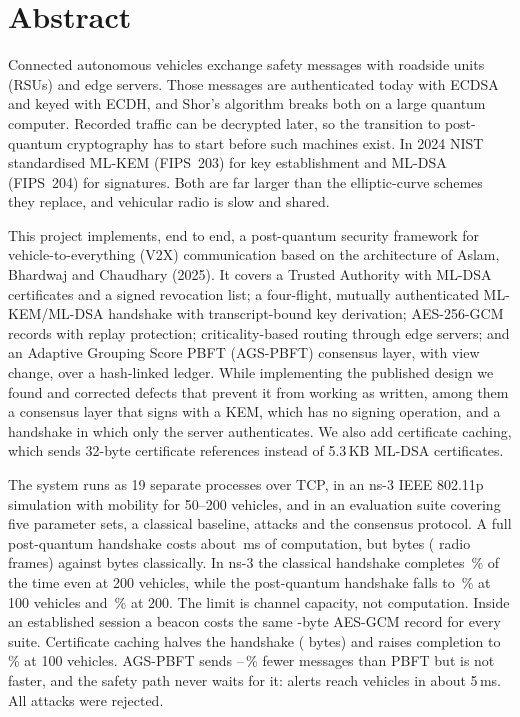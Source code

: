 \chapter*{Abstract}

Connected autonomous vehicles exchange safety messages with roadside units
(RSUs) and edge servers. Those messages are authenticated today with ECDSA
and keyed with ECDH, and Shor's algorithm breaks both on a large quantum
computer. Recorded traffic can be decrypted later, so the transition to
post-quantum cryptography has to start before such machines exist. In 2024
NIST standardised ML-KEM (FIPS~203) for key establishment and ML-DSA
(FIPS~204) for signatures. Both are far larger than the elliptic-curve
schemes they replace, and vehicular radio is slow and shared.

This project implements, end to end, a post-quantum security framework for
vehicle-to-everything (V2X) communication based on the architecture of
Aslam, Bhardwaj and Chaudhary (2025). It covers a Trusted Authority with
ML-DSA certificates and a signed revocation list; a four-flight, mutually
authenticated ML-KEM/ML-DSA handshake with transcript-bound key derivation;
AES-256-GCM records with replay protection; criticality-based routing through
edge servers; and an Adaptive Grouping Score PBFT (AGS-PBFT) consensus layer,
with view change, over a hash-linked ledger. While implementing the published
design we found and corrected defects that prevent it from working as written,
among them a consensus layer that signs with a KEM, which has no signing
operation, and a handshake in which only the server authenticates. We also
add certificate caching, which sends 32-byte certificate references instead
of 5.3\,KB ML-DSA certificates.

The system runs as 19 separate processes over TCP, in an ns-3 IEEE 802.11p
simulation with mobility for 50--200 vehicles, and in an evaluation suite
covering five parameter sets, a classical baseline,  attacks and the
consensus protocol. A full post-quantum
handshake costs about \,ms of computation, but
 bytes ( radio frames) against
 bytes classically. In ns-3 the classical handshake
completes \,\% of the time even at 200 vehicles,
while the post-quantum handshake falls to \,\% at
100 vehicles and \,\% at 200. The limit is channel
capacity, not computation. Inside an established session a beacon costs the
same -byte AES-GCM record for every suite.
Certificate caching halves the handshake ( bytes) and
raises completion to \,\% at 100 vehicles.
AGS-PBFT sends --\,\% fewer messages than PBFT
but is not faster, and the safety path never waits for it: alerts reach
vehicles in about 5\,ms. All  attacks were rejected.
